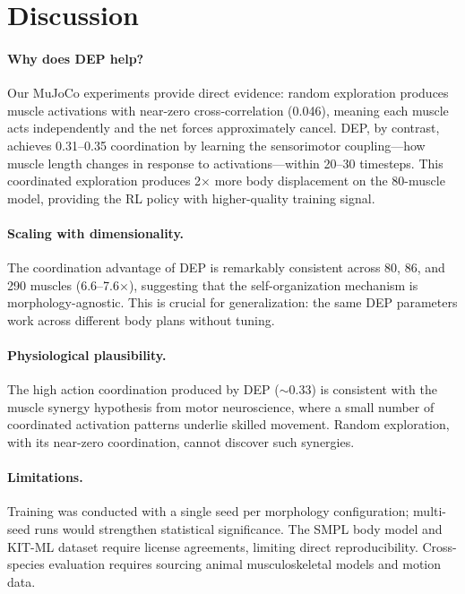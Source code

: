 \documentclass[10pt,twocolumn]{article}
\begin{document}
\section{Discussion}
\label{sec:discussion}

\paragraph{Why does DEP help?}
Our MuJoCo experiments provide direct evidence: random exploration produces muscle activations with near-zero cross-correlation (0.046), meaning each muscle acts independently and the net forces approximately cancel. DEP, by contrast, achieves 0.31--0.35 coordination by learning the sensorimotor coupling---how muscle length changes in response to activations---within 20--30 timesteps. This coordinated exploration produces 2$\times$ more body displacement on the 80-muscle model, providing the RL policy with higher-quality training signal.

\paragraph{Scaling with dimensionality.}
The coordination advantage of DEP is remarkably consistent across 80, 86, and 290 muscles (6.6--7.6$\times$), suggesting that the self-organization mechanism is morphology-agnostic. This is crucial for generalization: the same DEP parameters work across different body plans without tuning.

\paragraph{Physiological plausibility.}
The high action coordination produced by DEP ($\sim$0.33) is consistent with the muscle synergy hypothesis from motor neuroscience, where a small number of coordinated activation patterns underlie skilled movement. Random exploration, with its near-zero coordination, cannot discover such synergies.

\paragraph{Limitations.}
Training was conducted with a single seed per morphology configuration; multi-seed runs would strengthen statistical significance. The SMPL body model and KIT-ML dataset require license agreements, limiting direct reproducibility. Cross-species evaluation requires sourcing animal musculoskeletal models and motion data.
\end{document}
